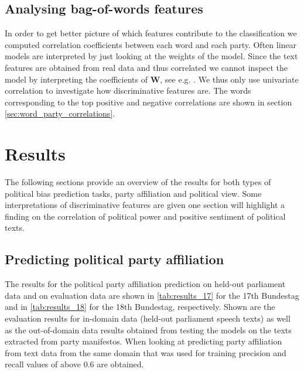 \documentclass[runningheads,a4paper]{llncs}
\renewcommand{\vec}[1]{\mathbf{#1}}
\begin{document}
\subsection{Analysing bag-of-words features}\label{sec:correlations_methods}
In order to get  better picture of which features contribute to the classification we computed correlation coefficients between each word and each party. Often linear models are interpreted by just looking at the weights of the model. Since the text features are obtained from real data and thus correlated we cannot inspect the model by interpreting the coefficients of $\vec{W}$, see e.g. \cite{Haufe2013}.  We thus only use univariate correlation to investigate how discriminative features are. The words corresponding to the top positive and negative correlations are shown in section \autoref{sec:word_party_correlations}.

\section{Results}\label{sec:results}

The following sections provide an overview of the results for both types of political bias prediction tasks, party affiliation and political view. Some interpretations of discriminative features are given one section will highlight a finding on the correlation of political power and positive sentiment of political texts. 

\subsection{Predicting political party affiliation}
The results for the political party affiliation prediction on held-out parliament data and on evaluation data are shown in \autoref{tab:results_17} for the 17th Bundestag and in \autoref{tab:results_18} for the 18th Bundestag, respectively. 
Shown are the evaluation results for in-domain data (held-out parliament speech texts) as well as the out-of-domain data results obtained from testing the models on the texts extracted from party manifestos. When looking at predicting party affiliation from text data from the same domain that was used for training precision and recall values of above 0.6 are obtained. \\
\end{document}
